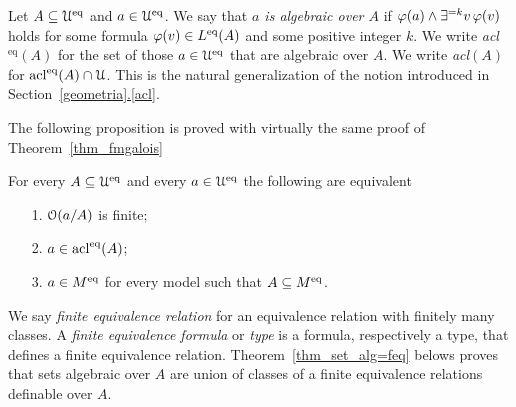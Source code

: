 \documentclass[creche.tex]{subfiles}
\begin{document}
Let $A\subseteq\EuScript U^{{\rm eq}}$ and $a\in\EuScript U^{{\rm eq}}$. We say that \emph{$a$ is algebraic over $A$\/} if $\varphi(a)\wedge\exists^{=k}v\,\varphi(v)$ holds for some formula $\varphi(v)\in L^{{\rm eq}}(A)$ and some positive integer $k$. We write \emph{acl$^\textrm{eq}(A)$\/} for the set of those $a\in\EuScript U^{{\rm eq}}$ that are algebraic over $A$. We write \emph{acl$(A)$\/} for $\mathop{\rm acl}^{{\rm eq}}(A)\cap\EuScript U$. This is the natural generalization of the notion introduced in Section~\hyperref[acl]{\ref*{geometria}.\ref*{acl}}.


The following proposition is proved with virtually the same proof of Theorem~\ref{thm_fmgalois}

\begin{theorem}\label{thm_Galois_alg=alg}
For every $A\subseteq\EuScript U^{{\rm eq}}$ and every $a\in\EuScript U^{{\rm eq}}$ the following are equivalent
\begin{itemize}
\item[1.] $\EuScript O(a/A)$ is finite;
\item[2.] $a\in\mathop{\rm acl}^{{\rm eq}}(A)$;
\item[3.] $a\in M^{{\rm eq}}$ for every model such that $A\subseteq M^{{\rm eq}}$.\QED
\end{itemize}
\end{theorem}





We say \emph{finite equivalence relation\/} for an equivalence relation with finitely many classes. A \emph{finite equivalence formula\/} or \emph{type\/} is a formula, respectively a type, that defines a finite equivalence relation. Theorem~\ref{thm_set_alg=feq} belows proves that sets algebraic over $A$ are union of classes of a finite equivalence relations definable over $A$.
\end{document}
